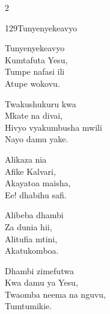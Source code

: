 \documentclass{article}
\begin{document}
\begin{multicols}{2}
\begin{hymn}{129}{Tunyenyekeavyo}{}
\begin{stanza}
Tunyenyekeavyo\\
Kumtafuta Yesu,\\
Tumpe nafasi ili\\
Atupe wokovu.
\end{stanza}
\begin{chorus}
Twakushukuru kwa\\
Mkate na divai,\\
Hivyo vyakumbusha mwili\\
Nayo damu yake.
\end{chorus}
\begin{stanza}
Alikaza nia\\
Afike Kalvari,\\
Akayatoa maisha,\\
Ee! dhabihu safi.
\end{stanza}
\begin{stanza}
Alibeba dhambi\\
Za dunia hii,\\
Alitufia mtini,\\
Akatukomboa.
\end{stanza}
\begin{stanza}
Dhambi zimefutwa\\
Kwa damu ya Yesu,\\
Twaomba neema na nguvu,\\
Tumtumikie.
\end{stanza}
\end{hymn}


\end{multicols}
\end{document}
